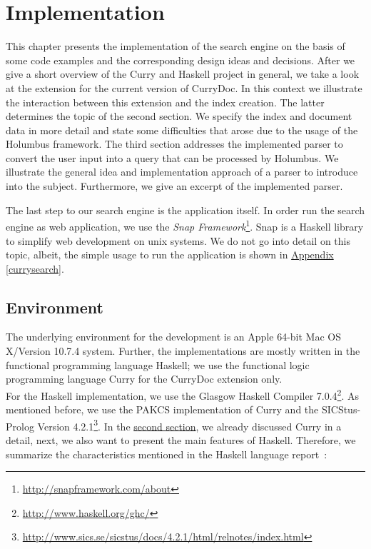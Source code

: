\documentclass[%
	latex,%
	a4paper,%
	oneside,%
	chapterprefix,%
	headsepline,%
	12pt%
]{scrbook}
\begin{document}
\chapter{Implementation}\label{implementation}

This chapter presents the implementation of the search engine on the
basis of some code examples and the corresponding design ideas and
decisions. %
After we give a short overview of the Curry and Haskell project in
general, we take a look at the extension for the current version of
CurryDoc. %
In this context we illustrate the interaction between this extension
and the index creation. %
The latter determines the topic of the second section. %
We specify the index and document data in more detail and state some
difficulties that arose due to the usage of the Holumbus framework. %
The third section addresses the implemented parser to convert the user
input into a query that can be processed by Holumbus. %
We illustrate the general idea and implementation approach of a parser
to introduce into the subject. %
Furthermore, we give an excerpt of the implemented parser. %

The last step to our search engine is the application itself. %
In order run the search engine as web application, we use the
\emph{Snap
  Framework}\footnote{\url{http://snapframework.com/about}}. %
Snap is a Haskell library to simplify web development on unix
systems. %
We do not go into detail on this topic, albeit, the simple usage to
run the application is shown in \hyperref[currysearch]{Appendix
  \ref{currysearch}}. %

\section{Environment}

The underlying environment for the development is an Apple 64-bit Mac OS
X/Version 10.7.4 system. %
Further, the implementations are mostly written in the functional
programming language Haskell; we use the functional logic programming
language
Curry for the CurryDoc extension only.\\
For the Haskell implementation, we use the Glasgow Haskell Compiler
7.0.4\footnote{\url{http://www.haskell.org/ghc/}}. %
As mentioned before, we use the PAKCS implementation of Curry and the
SICStus-Prolog Version
4.2.1\footnote{\url{http://www.sics.se/sicstus/docs/4.2.1/html/relnotes/index.html}}. %
In the \hyperref[preliminaries:curry]{second section}, we already
discussed Curry in a detail, next, we also want to present the main
features of Haskell. %
Therefore, we summarize the characteristics mentioned in the Haskell
language report~\cite{haskellreport}:
\end{document}

